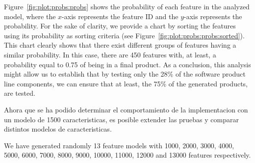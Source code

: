 Figure~\ref{fig:plot:probs:probs} shows the probability of each feature in the analyzed model, where the $x$-axis
represents the feature ID and the $y$-axis represents the probability. For the sake of clarity, we provide a chart by sorting the features using its probability as sorting criteria (see Figure~\ref{fig:plot:probs:probs:sorted}).
This chart clearly shows that there exist different groups of features having a similar probability.
%
In this case, there are 450 features with, at least, a probability equal to 0.75 of being in a final product. As a conclusion,
this analysis might allow us to establish that by testing only the 28\% of the software product line components, we can ensure that
at least, the 75\% of the generated products, are tested.



Ahora que se ha podido determinar el comportamiento
de la implementacion con un modelo de 1500 caracteristicas, es
posible extender las pruebas y comparar distintos modelos
de caracteristicas.

We have generated randomly 13 feature models with 1000, 2000, 3000, 4000, 5000, 6000, 7000, 8000, 9000, 10000, 11000, 12000 and 13000 features respectively.


